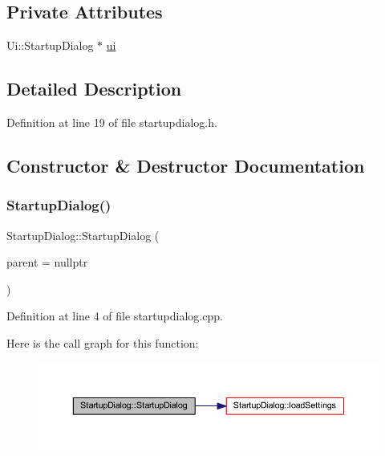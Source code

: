 \subsection*{Private Attributes}
\begin{DoxyCompactItemize}
\item 
Ui\+::\+Startup\+Dialog $\ast$ \mbox{\hyperlink{classStartupDialog_abd18126b373fe2249cfd15cd9cadce5b}{ui}}
\end{DoxyCompactItemize}


\subsection{Detailed Description}


Definition at line 19 of file startupdialog.\+h.



\subsection{Constructor \& Destructor Documentation}
\mbox{\label{classStartupDialog_a720174c5233d6b33f5d65b9c404b4445}} 
\subsubsection{\texorpdfstring{StartupDialog()}{StartupDialog()}}
{\footnotesize\ttfamily Startup\+Dialog\+::\+Startup\+Dialog (\begin{DoxyParamCaption}\item[{Q\+Widget $\ast$}]{parent = {\ttfamily nullptr} }\end{DoxyParamCaption})\hspace{0.3cm}{\ttfamily [explicit]}}



Definition at line 4 of file startupdialog.\+cpp.

Here is the call graph for this function\+:
\nopagebreak
\begin{figure}[H]
\begin{center}
\leavevmode
\includegraphics[width=350pt]{classStartupDialog_a720174c5233d6b33f5d65b9c404b4445_cgraph}
\end{center}
\end{figure}
\mbox{\label{classStartupDialog_a21e41329a66a0ceb4aae21baba78bd0d}} 
